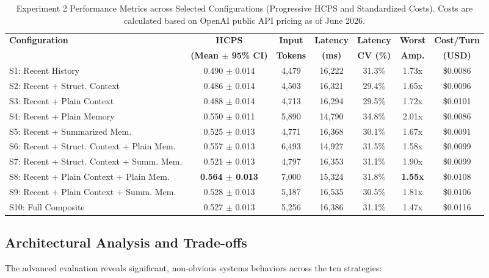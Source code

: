 \documentclass[11pt,journal,onecolumn]{article}
\begin{document}
\begin{table}[h]
\centering
\small
\setlength{\tabcolsep}{6pt}
\caption{Experiment 2 Performance Metrics across Selected Configurations (Progressive HCPS and Standardized Costs). Costs are calculated based on OpenAI public API pricing as of June 2026.}
\label{tab:advanced_results}
\begin{tabularx}{\textwidth}{>{\raggedright\arraybackslash}Xcccccc}
\toprule
\textbf{Configuration} & \textbf{HCPS} & \textbf{Input} & \textbf{Latency} & \textbf{Latency} & \textbf{Worst} & \textbf{Cost/Turn} \\
 & \textbf{(Mean $\pm$ 95\% CI)} & \textbf{Tokens} & \textbf{(ms)} & \textbf{CV (\%)} & \textbf{Amp.} & \textbf{(USD)} \\
\midrule
S1: Recent History & 0.490 $\pm$ 0.014 & 4,479 & 16,222 & 31.3\% & 1.73x & \$0.0086 \\
S2: Recent + Struct. Context & 0.486 $\pm$ 0.014 & 4,503 & 16,321 & 29.4\% & 1.65x & \$0.0096 \\
S3: Recent + Plain Context & 0.488 $\pm$ 0.014 & 4,713 & 16,294 & 29.5\% & 1.72x & \$0.0101 \\
S4: Recent + Plain Memory & 0.550 $\pm$ 0.011 & 5,890 & 14,790 & 34.8\% & 2.01x & \$0.0086 \\
S5: Recent + Summarized Mem. & 0.525 $\pm$ 0.013 & 4,771 & 16,368 & 30.1\% & 1.67x & \$0.0091 \\
S6: Recent + Struct. Context + Plain Mem. & 0.557 $\pm$ 0.013 & 6,493 & 14,927 & 31.5\% & 1.58x & \$0.0099 \\
S7: Recent + Struct. Context + Summ. Mem. & 0.521 $\pm$ 0.013 & 4,797 & 16,353 & 31.1\% & 1.90x & \$0.0099 \\
S8: Recent + Plain Context + Plain Mem. & \textbf{0.564 $\pm$ 0.013} & 7,000 & 15,324 & 31.8\% & \textbf{1.55x} & \$0.0108 \\
S9: Recent + Plain Context + Summ. Mem. & 0.528 $\pm$ 0.013 & 5,187 & 16,535 & 30.5\% & 1.81x & \$0.0106 \\
S10: Full Composite & 0.527 $\pm$ 0.013 & 5,256 & 16,386 & 31.1\% & 1.47x & \$0.0116 \\
\bottomrule
\end{tabularx}
\end{table}

\subsection{Architectural Analysis and Trade-offs}
The advanced evaluation reveals significant, non-obvious systems behaviors across the ten strategies:
\end{document}
